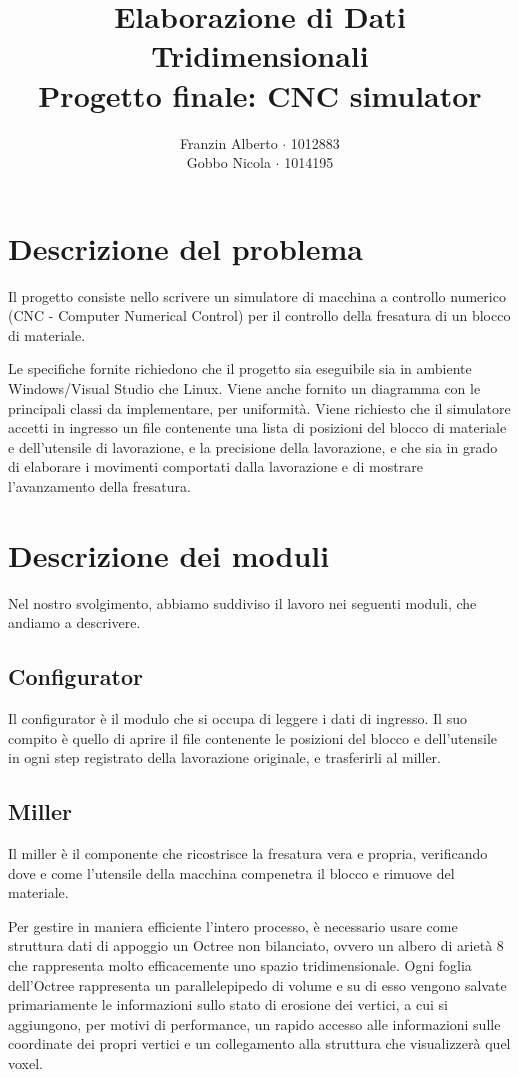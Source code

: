 \documentclass[11pt,a4paper,twoside,openright,titlepage,fleqn,%
               headinclude,,footinclude,BCOR5mm,%
               numbers=noenddot,cleardoublepage=empty,%
               tablecaptionabove]{scrreprt}
\title{Elaborazione di Dati Tridimensionali\\
Progetto finale: CNC simulator}
\author{Franzin Alberto $\cdot$ 1012883\\Gobbo Nicola $\cdot$ 1014195}
\begin{document}
\maketitle

\section{Descrizione del problema}
Il progetto consiste nello scrivere un simulatore di macchina a controllo numerico (CNC - Computer Numerical Control) per il controllo della fresatura di un blocco di materiale.

Le specifiche fornite richiedono che il progetto sia eseguibile sia in ambiente Windows/Visual Studio che Linux. Viene anche fornito un diagramma con le principali classi da implementare, per uniformità. Viene richiesto che il simulatore accetti in ingresso un file contenente una lista di posizioni del blocco di materiale e dell'utensile di lavorazione, e la precisione della lavorazione, e che sia in grado di elaborare i movimenti comportati dalla lavorazione e di mostrare l'avanzamento della fresatura.

\section{Descrizione dei moduli}
Nel nostro svolgimento, abbiamo suddiviso il lavoro nei seguenti moduli, che andiamo a descrivere.

\subsection{Configurator}
Il configurator è il modulo che si occupa di leggere i dati di ingresso. Il suo compito è quello di aprire il file contenente le posizioni del blocco e dell'utensile in ogni step registrato della lavorazione originale, e trasferirli al miller.

\subsection{Miller}
Il miller è il componente che ricostrisce la fresatura vera e propria, verificando dove e come l'utensile della macchina compenetra il blocco e rimuove del materiale.

Per gestire in maniera efficiente l'intero processo, è necessario usare come struttura dati di appoggio un Octree non bilanciato, ovvero un albero di arietà 8 che rappresenta molto efficacemente uno spazio tridimensionale. Ogni foglia dell’Octree rappresenta un parallelepipedo di volume e su di esso vengono salvate primariamente le informazioni sullo stato di erosione dei vertici, a cui si aggiungono, per motivi di performance, un rapido accesso alle informazioni sulle coordinate dei propri vertici e un collegamento alla struttura che visualizzerà quel voxel.
\end{document}
